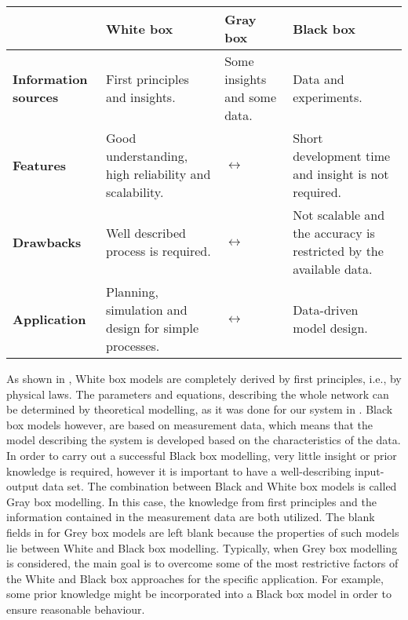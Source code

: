 \begin{center}
    \begin{tabular}{ | >{\centering\arraybackslash}m{1.8cm} | >{\centering\arraybackslash}m{3.6cm} | >{\centering\arraybackslash}m{3.6cm} | >{\centering\arraybackslash}m{3.6cm} |}
    \hline
    \multirow{1}{*}
     & \textbf{White box} & \textbf{Gray box} & \textbf{Black box} \\ 
     \hline
     \multirow{1}{*}
    \textbf{Information sources} & First principles and insights. &  Some insights and some data. & Data and experiments.\\ 
    \hline
      \multirow{1}{*}
    \textbf{Features} & Good understanding, high reliability and scalability. & $\longleftrightarrow$  & Short development time and insight is not required.\\ 
    \hline
      \multirow{1}{*}
    \textbf{Drawbacks} & Well described process is required. & $\longleftrightarrow$ & Not scalable and the accuracy is restricted by the available data.\\ 
    \hline
          \multirow{1}{*}
    \textbf{Application} & Planning, simulation and design for simple processes. & $\longleftrightarrow$ & Data-driven model design.\\ 
    \hline
    \end{tabular}
    \label{comparisontable_sysid}
\end{center}

\vspace{-3mm}

As shown in , White box models are completely derived by first principles, i.e., by physical laws. The parameters and equations, describing the whole network can be determined by theoretical modelling, as it was done for our system in . Black box models however, are based on measurement data, which means that the model describing the system is developed based on the characteristics of the data. In order to carry out a successful Black box modelling, very little insight or prior knowledge is required, however it is important to have a well-describing input-output data set. The combination between Black and White box models is called Gray box modelling. In this case, the knowledge from first principles and the information contained in the measurement data are both utilized. The blank fields in  for Grey box models are left blank because the properties of such models lie between White and Black box modelling. Typically, when Grey box modelling is considered, the main goal is to overcome some of the most restrictive factors of the White and Black box approaches for the specific application. For example, some prior knowledge might be incorporated into a Black box model in order to ensure reasonable behaviour\cite{nelles2013nonlinear}. 


